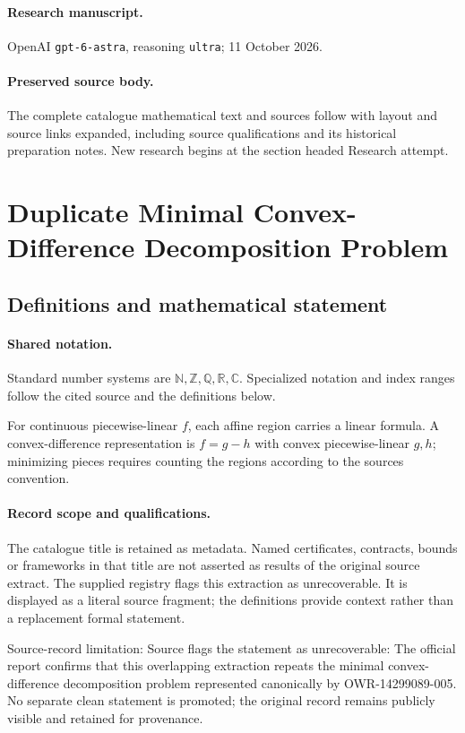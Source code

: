 \documentclass[11pt]{article}
\begin{document}
\paragraph{Research manuscript.} OpenAI \texttt{gpt-6-astra}, reasoning \texttt{ultra}; 11 October 2026.
\paragraph{Preserved source body.} The complete catalogue mathematical text and sources follow with layout and source links expanded, including source qualifications and its historical preparation notes. New research begins at the section headed Research attempt.

\section{Duplicate Minimal Convex-Difference Decomposition Problem}\label{statement}

\subsection{Definitions and mathematical statement}

\paragraph{Shared notation.}Standard number systems are $\mathbb N,\mathbb Z,\mathbb Q,\mathbb R,\mathbb C$. Specialized notation and index ranges follow the cited source and the definitions below.


For continuous piecewise-linear $f$, each affine region carries a linear formula. A convex-difference representation is $f=g-h$ with convex piecewise-linear $g,h$; minimizing pieces requires counting the regions according to the source\textquotesingle s convention.
\paragraph{Record scope and qualifications.}
The catalogue title is retained as metadata. Named certificates, contracts, bounds or frameworks in that title are not asserted as results of the original source extract.
The supplied registry flags this extraction as unrecoverable. It is displayed as a literal source fragment; the definitions provide context rather than a replacement formal statement.

Source-record limitation: Source flags the statement as unrecoverable: The official report confirms that this overlapping extraction repeats the minimal convex-difference decomposition problem represented canonically by OWR-14299089-005. No separate clean statement is promoted; the original record remains publicly visible and retained for provenance.
\end{document}
